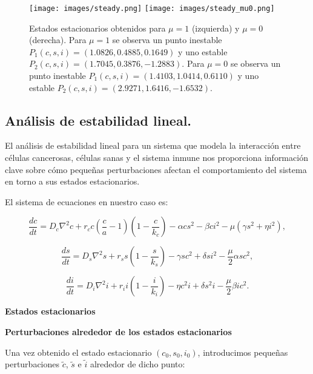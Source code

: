 \documentclass{article}
\begin{document}
\begin{figure}[htbp]
\centering
\texttt{[image: images/steady.png]}
\texttt{[image: images/steady\_mu0.png]}
\caption{Estados estacionarios obtenidos para $\mu = 1$ (izquierda) y $\mu = 0$ (derecha). Para $\mu = 1$ se observa un punto inestable $P_1(c,s,i) = (1.0826, 0.4885, 0.1649)$ y uno estable $P_2(c,s,i) = (1.7045, 0.3876, -1.2883)$. Para $\mu = 0$ se observa un punto inestable $P_1(c,s,i) = (1.4103, 1.0414, 0.6110)$ y uno estable $P_2(c,s,i) = (2.9271, 1.6416, -1.6532)$.}
\label{fig:steady_gral}
\end{figure}
\subsection{Análisis de estabilidad lineal.}


El análisis de estabilidad lineal para un sistema que modela la interacción entre células cancerosas, células sanas y el sistema inmune nos proporciona información clave sobre cómo pequeñas perturbaciones afectan el comportamiento del sistema en torno a sus estados estacionarios.

El sistema de ecuaciones en nuestro caso es:

\begin{equation}
    \frac{dc}{dt} = D_c \nabla^2 c + r_c c \left(\frac{c}{a} - 1\right)\left(1-\frac{c}{k_c}\right) - \alpha c s^2  - \beta c i^2  - \mu ( \gamma s^2+ \eta i^2),
     \label{eqn:cancer_dynamic_spatial}
\end{equation}

\begin{equation}
    \frac{ds}{dt} = D_s \nabla^2 s + r_s s \left(1 - \frac{s}{k_s}\right) - \gamma s c^2 + \delta s i^2 - \frac{\mu}{2} \alpha s c^2 ,
    \label{eqn:sano_dynamic_spatial}
\end{equation}

\begin{equation}
    \frac{di}{dt} = D_i \nabla^2 i + r_i i \left(1-\frac{i}{k_i}\right) - \eta c^2 i + \delta s^2 i - \frac{\mu}{2}\beta i c^2 .
    \label{eqn:inmune_dynamic_spatial}
\end{equation}


\textbf{Estados estacionarios}
\vspace{0.2cm}


\textbf{Perturbaciones alrededor de los estados estacionarios}
\vspace{0.2cm}

Una vez obtenido el estado estacionario $(c_0, s_0, i_0)$, introducimos pequeñas perturbaciones $\tilde{c}$, $\tilde{s}$ e $\tilde{i}$ alrededor de dicho punto:
\end{document}
